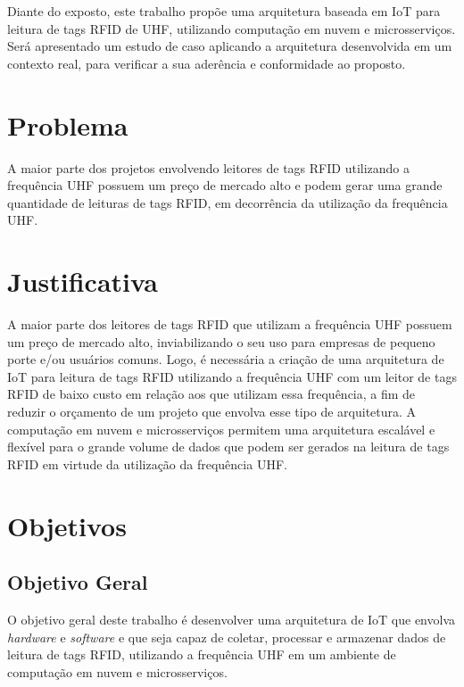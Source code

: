 Diante do exposto, este trabalho propõe uma arquitetura baseada em \acrlong{IoT} para leitura de tags \acrshort{RFID} de \acrlong{UHF}, utilizando computação em nuvem e microsserviços. Será apresentado um estudo de caso aplicando a arquitetura desenvolvida em um contexto real, para verificar a sua aderência e conformidade ao proposto.

\section{Problema}

A maior parte dos projetos envolvendo leitores de tags \acrshort{RFID} utilizando a frequência \acrshort{UHF} possuem um preço de mercado alto e podem gerar uma grande quantidade de leituras de tags \acrshort{RFID}, em decorrência da utilização da frequência \acrshort{UHF}.

\section{Justificativa}

A maior parte dos leitores de tags \acrshort{RFID} que utilizam a frequência \acrshort{UHF} possuem um preço de mercado alto, inviabilizando o seu uso para empresas de pequeno porte e/ou usuários comuns. Logo, é necessária a criação de uma arquitetura de \acrshort{IoT} para leitura de tags \acrshort{RFID} utilizando a frequência \acrshort{UHF} com um leitor de tags \acrshort{RFID} de baixo custo em relação aos que utilizam essa frequência, a fim de reduzir o orçamento de um projeto que envolva esse tipo de arquitetura. A computação em nuvem e microsserviços permitem uma arquitetura escalável e flexível para o grande volume de dados que podem ser gerados na leitura de tags \acrshort{RFID} em virtude da utilização da frequência \acrshort{UHF}.

\section{Objetivos}
\label{sec:objetivos}

\subsection{Objetivo Geral}

O objetivo geral deste trabalho é desenvolver uma arquitetura de \acrshort{IoT} que envolva \textit{hardware} e \textit{software} e que seja capaz de coletar, processar e armazenar dados de leitura de tags \acrshort{RFID}, utilizando a frequência \acrshort{UHF} em um ambiente de computação em nuvem e microsserviços.

